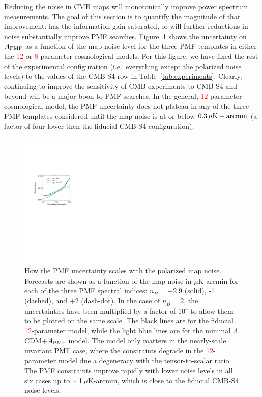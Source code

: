 \documentclass[apj]{emulateapj}
\newcommand{\apmf}{\ensuremath{A_{\rm PMF}}}
\newcommand{\lcdm}{\ensuremath{\Lambda}CDM}
\newcommand{\ukarcmin}{\ensuremath{\mu}{\rm K-arcmin}}
\newcommand{\changed}[1]{\textcolor{Red}{#1}}
\begin{document}
Reducing the noise in CMB maps will monotonically improve power spectrum measurements. 
The goal of this section is to quantify the magnitude of that improvement: has the information gain saturated, or will further reductions in noise substantially improve PMF searches. 
Figure~\ref{fig:sensitivity} shows the uncertainty on \apmf{} as a function of the map noise level for the three PMF templates in either the \changed{12} or \changed{8}-parameter cosmological models. 
For this figure, we have fixed the rest of the experimental configuration (i.e.~everything except the polarized noise levels) to the values of the CMB-S4 row in Table~\ref{tab:experiments}. 
Clearly, continuing to improve the sensitivity of CMB experiments to CMB-S4 and beyond will be a major boon to PMF searches. 
In the general, \changed{12}-parameter cosmological model, the PMF uncertainty does not plateau in any of the three PMF templates considered until the map noise is at or below $0.3\,\ukarcmin$ (a factor of four lower then the fiducial CMB-S4 configuration). 


\begin{figure}[htb]\centering
\includegraphics[width=0.45\textwidth,clip,trim={2.cm 12.5cm 11cm 7.5cm}]{pmf_sens.pdf}
  \caption[]{ \label{fig:sensitivity}
  How the PMF uncertainty  scales with the polarized map noise. 
  Forecasts are shown as a function of the map noise in \ukarcmin{} for each of the three PMF spectral indices: $n_B = -2.9$ (solid), -1 (dashed), and +2 (dash-dot). 
  In the case of $n_B=2$, the uncertainties have been multiplied by a factor of $10^5$ to allow them to be plotted on the same scale. 
  The black lines are for the fiducial \changed{12}-parameter model, while the light blue lines are for the minimal \lcdm{}+\apmf{} model. 
  The model only matters in the nearly-scale invariant PMF case, where the constraints degrade in the \changed{12}-parameter model due a degeneracy with the tensor-to-scalar ratio. 
  The PMF constraints improve rapidly with lower noise levels in all six cases up to $\sim$\,1\,\ukarcmin, which is close to the  fiducial CMB-S4 noise levels. 
    }
\end{figure}
\end{document}
